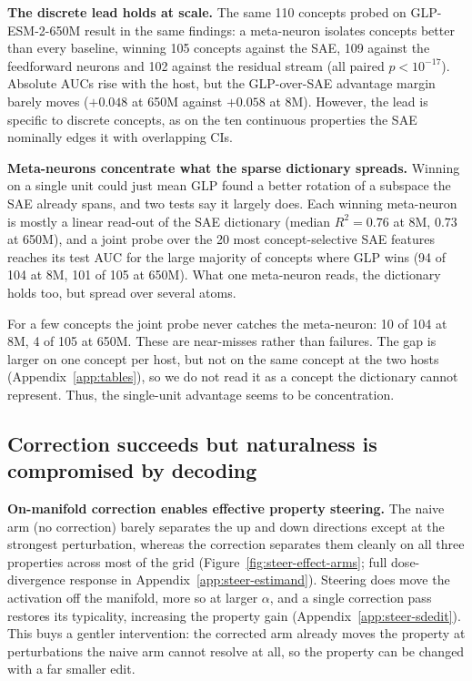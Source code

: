 \documentclass{article}
\begin{document}
\textbf{The discrete lead holds at scale.} The same 110 concepts probed on GLP-ESM-2-650M result in the same findings: a meta-neuron isolates concepts better
than every baseline, winning 105 concepts against the SAE, 109 against the feedforward
neurons and 102 against the residual stream (all paired $p{<}10^{-17}$). Absolute AUCs rise
with the host, but the GLP-over-SAE advantage margin barely moves
($+0.048$ at 650M against $+0.058$ at 8M). However, the lead is specific to discrete concepts, as on the ten continuous properties the SAE nominally edges it with overlapping CIs.

\textbf{Meta-neurons concentrate what the sparse dictionary spreads.} Winning on a single
unit could just mean GLP found a better rotation of a subspace the SAE already spans, and two tests say it largely does. Each winning meta-neuron is mostly a linear
read-out of the SAE dictionary (median $R^2 = 0.76$ at 8M, $0.73$ at 650M), and a joint probe
over the 20 most concept-selective SAE features reaches its test AUC for the large majority
of concepts where GLP wins (94 of 104 at 8M, 101 of 105 at 650M). What one meta-neuron reads, the dictionary holds too, but spread over several atoms.

For a few concepts the joint probe never catches the meta-neuron: 10 of 104 at 8M, 4 of 105
at 650M. These are near-misses rather than failures. The gap is larger on one concept per host, but not on the same concept at the
two hosts (Appendix~\ref{app:tables}), so we do not read it as a concept the dictionary cannot
represent. Thus, the single-unit advantage seems to be concentration.


\subsection{Correction succeeds but naturalness is compromised by decoding}
\label{sec:steering-results}


\textbf{On-manifold correction enables effective property steering.} The naive arm (no
correction) barely separates the up and down directions except at the strongest
perturbation, whereas the correction separates them cleanly on all three properties
across most of the grid (Figure~\ref{fig:steer-effect-arms}; full dose-divergence response in
Appendix~\ref{app:steer-estimand}). Steering does move the activation off the manifold, more so at larger $\alpha$, and a single
correction pass restores its typicality, increasing the property gain (Appendix~\ref{app:steer-sdedit}).  This buys a gentler intervention: the corrected arm
already moves the property at perturbations the naive arm cannot resolve at all, so the
property can be changed with a far smaller edit.
\end{document}
